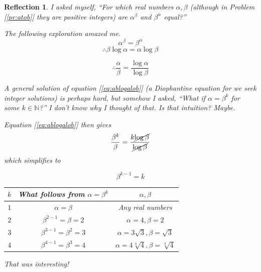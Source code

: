 \documentclass[english,notitlepage,smartquotes]{hgbreport}
\theoremstyle{definition}
\theoremstyle{problem}
\theoremstyle{remark}
\theoremstyle{plain}
\newtheorem{reflection}{Reflection}
\begin{document}
\begin{reflection}

I asked myself, ``For which real numbers $\alpha,\beta$ (although in Problem [\ref{pr:atob}] they are positive integers) are $\alpha^\beta$ and $\beta^\alpha$ equal?''

The following exploration amazed me.
$$
\alpha^\beta=\beta^\alpha
$$
\begin{equation}
\label{eq:takelogs}
\therefore \beta\log\alpha=\alpha\log\beta
\end{equation}

\begin{equation}
\label{eq:ablogalob}
\therefore \frac{\alpha}{\beta}=\frac{\log\alpha}{\log\beta}
\end{equation}

A general solution of equation [\ref{eq:ablogalob}] (a Diophantine equation for we seek integer solutions) is perhaps hard, but somehow I asked, ``What if $\alpha=\beta^k$ for some $k\in\mathbb N$?'' I don't know why I thought of that. Is that intuition? Maybe.

Equation [\ref{eq:ablogalob}] then gives
$$
\frac{\beta^k}{\beta}=\frac{k\cancel{\log\beta}}{\cancel{\log\beta}}
$$
which simplifies to

\begin{equation}
\label{eq:bk-1k}
\beta^{k-1}=k
\end{equation}


\begin{tabular}{|c|c|c|}
 \hline
 $k$ & What follows from $\alpha=\beta^k$ & $\alpha,\beta$ \\ \hline
 \hline
 $1$ & $\alpha=\beta$  & Any real numbers \\ \hline
 $2$ & $\beta^{2-1}=\beta=2$ & $\alpha=4,\beta=2$ \\ \hline
 $3$ & $\beta^{3-1}=\beta^2=3$ & $\alpha=3\sqrt{3},\beta=\sqrt{3}$ \\ \hline
 $4$ & $\beta^{4-1}=\beta^3=4$ & $\alpha=4\sqrt[3]{4},\beta=\sqrt[3]{4}$ \\ \hline
\end{tabular}


That was interesting! 

\end{reflection}
\end{document}
